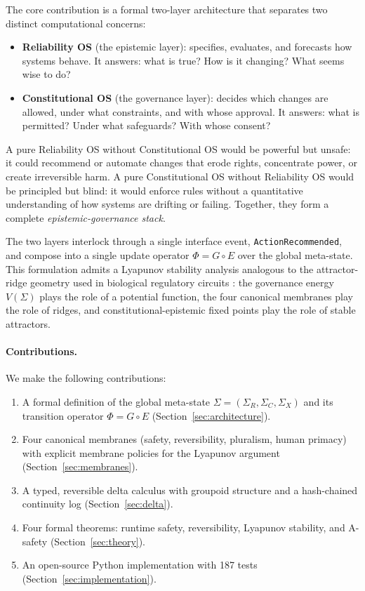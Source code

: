 \documentclass[11pt]{article}
\begin{document}
The core contribution is a formal two-layer architecture that
separates two distinct computational concerns:

\begin{itemize}
\item \textbf{Reliability OS} (the epistemic layer): specifies,
  evaluates, and forecasts how systems behave. It answers: what is
  true? How is it changing? What seems wise to do?

\item \textbf{Constitutional OS} (the governance layer): decides
  which changes are allowed, under what constraints, and with whose
  approval. It answers: what is permitted? Under what safeguards?
  With whose consent?
\end{itemize}

A pure Reliability OS without Constitutional OS would be powerful
but unsafe: it could recommend or automate changes that erode
rights, concentrate power, or create irreversible harm. A pure
Constitutional OS without Reliability OS would be principled but
blind: it would enforce rules without a quantitative understanding
of how systems are drifting or failing. Together, they form a
complete \emph{epistemic-governance stack}.

The two layers interlock through a single interface event,
\texttt{ActionRecommended}, and compose into a single update
operator $\Phi = G \circ E$ over the global meta-state. This
formulation admits a Lyapunov stability analysis analogous to the
attractor-ridge geometry used in biological regulatory circuits
\citep{ferrell2002bistability,huang2009cellfate}: the governance
energy $V(\Sigma)$ plays the role of a potential function, the
four canonical membranes play the role of ridges, and
constitutional-epistemic fixed points play the role of stable
attractors.

\paragraph{Contributions.} We make the following contributions:
\begin{enumerate}
  \item A formal definition of the global meta-state
    $\Sigma = (\Sigma_R, \Sigma_C, \Sigma_X)$ and its transition
    operator $\Phi = G \circ E$ (Section~\ref{sec:architecture}).
  \item Four canonical membranes (safety, reversibility, pluralism,
    human primacy) with explicit membrane policies for the
    Lyapunov argument (Section~\ref{sec:membranes}).
  \item A typed, reversible delta calculus with groupoid structure
    and a hash-chained continuity log (Section~\ref{sec:delta}).
  \item Four formal theorems: runtime safety, reversibility,
    Lyapunov stability, and A-safety (Section~\ref{sec:theory}).
  \item An open-source Python implementation with 187 tests
    (Section~\ref{sec:implementation}).
\end{enumerate}
\end{document}

